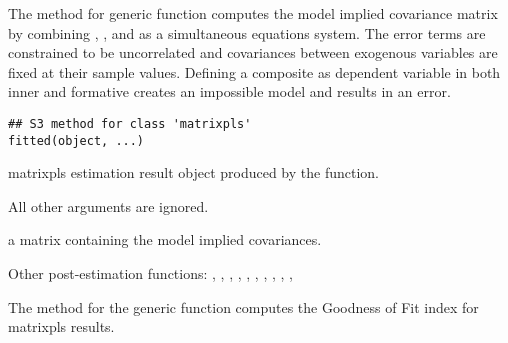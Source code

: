 \documentclass[a4paper]{book}
\begin{document}
%
\begin{Description}\relax
The  method for generic function  computes the model implied
covariance matrix by combining  , , and  as a 
simultaneous equations system. The error terms are constrained to be uncorrelated and 
covariances between exogenous variables are fixed at their sample values. Defining a
composite as dependent variable in both inner and formative creates an impossible model
and results in an error.
\end{Description}
%
\begin{Usage}
\begin{verbatim}
## S3 method for class 'matrixpls'
fitted(object, ...)
\end{verbatim}
\end{Usage}
%
\begin{Arguments}
\begin{ldescription}
\item[\code{object}] matrixpls estimation result object produced by the  function.

\item[\code{...}] All other arguments are ignored.
\end{ldescription}
\end{Arguments}
%
\begin{Value}
a matrix containing the model implied covariances.
\end{Value}
%
\begin{SeeAlso}\relax
Other post-estimation functions: 
,
,
,
,
,
,
,
,
,
,
\end{SeeAlso}
%
\begin{Description}\relax
The  method for the generic function  computes the Goodness of Fit index for matrixpls results.
\end{Description}
\end{document}

